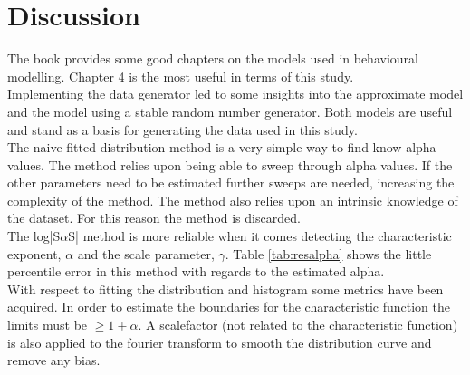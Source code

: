 \chapter{Discussion}
The book\cite{viswanathan2011the} provides some good chapters on the models used in behavioural modelling. Chapter 4 is the most useful in terms of this study.\\
Implementing the data generator led to some insights into the approximate model and the model using a stable random number generator. 
Both models are useful and stand as a basis for generating the data used in this study.\\
The naive fitted distribution method is a very simple way to find know alpha values. 
The method relies upon being able to sweep through alpha values. 
If the other parameters need to be estimated further sweeps are needed, increasing the complexity of the method. 
The method also relies upon an intrinsic knowledge of the dataset. 
For this reason the method is discarded.\\
The log|S$\alpha$S| method is more reliable when it comes detecting the characteristic exponent, $\alpha$ and the scale parameter, $\gamma$. Table \ref{tab:resalpha} shows the little percentile error in this method with regards to the estimated alpha.\\
With respect to fitting the distribution and histogram some metrics have been acquired. 
In order to estimate the boundaries for the characteristic function the limits must be  $\geq 1 + \alpha$. 
A scalefactor (not related to the characteristic function) is also applied to the fourier transform to smooth the distribution curve and remove any bias.\\

